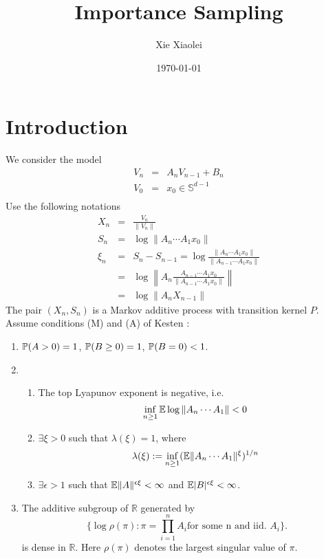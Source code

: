 \documentclass{article}
\title{Importance Sampling}
\author{Xie Xiaolei}
\date{\today}
\theoremstyle{remark}
\begin{document}
\maketitle
\section{Introduction}
We consider the model
\begin{eqnarray*}
V_n &=& A_n V_{n-1} + B_n\\
V_0 &=& x_0 \in \mathbb S^{d-1}\\
\end{eqnarray*}
Use the following notations
\begin{eqnarray*}
X_n &=& \frac{V_n}{\|V_n\|} \\
S_n &=& \log \|A_n \cdots A_1 x_0\| \\
\xi_n &=& S_n - S_{n-1} = \log\frac{\|A_n \cdots A_1 x_0\|}{\|A_{n-1}
  \cdots A_1 x_0\|} \\
&=& \log\left\| A_n \frac{A_{n-1} \cdots A_1 x_0}{\|A_{n-1} \cdots A_1
    x_0\|} \right\|\\
&=& \log \|A_n X_{n-1}\|
\end{eqnarray*}
The pair $(X_n, S_n)$ is a Markov additive process with transition
kernel $P$. Assume conditions (M) and (A) of Kesten \cite{Kesten1973}:
\begin{enumerate}
  \item $\P(A > 0) = 1$, $\P(B \geq 0) = 1$, $\P(B = 0) < 1$.
   
\item
  \begin{enumerate}
  \item The top Lyapunov exponent is negative, i.e.
    \begin{equation}
      \label{eq:neg_top_Lyapunov}
      \inf_{n \geq 1} \E \log \|A_n \cdots A_1\| < 0    
    \end{equation}
  \item $\exists \xi > 0$ such that $\lambda(\xi) = 1$, where
    $$
    \lambda(\xi) := \inf_{n \geq 1} (\E \|A_n \cdots A_1\|^\xi)^{1/n}
    $$
    \item $\exists \epsilon > 1$ such that $\E \|A\|^{\epsilon\xi} <
      \infty$ and $\E |B|^{\epsilon\xi} < \infty$.
  \end{enumerate}
  \item The additive subgroup of $\mathbb R$ generated by
    \[
    \{\log \rho(\pi): \pi = \prod_{i=1}^n A_i \text{for some n and
      iid. } A_i\}.
    \]
    is dense in $\mathbb R$. Here $\rho(\pi)$ denotes the largest
    singular value of $\pi$.
\end{enumerate}
\end{document}
